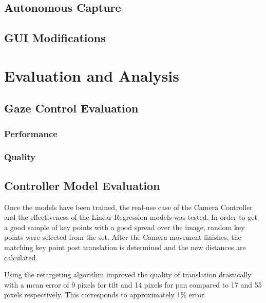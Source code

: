 \documentclass{l4proj}
\begin{document}
\section{Autonomous Capture}

\section{GUI Modifications}


\chapter{Evaluation and Analysis}

\section{Gaze Control Evaluation}
\subsection{Performance}
\subsection{Quality}

\section{Controller Model Evaluation}

Once the models have been trained, the real-use case of the Camera Controller and the effectiveness of the Linear Regression models was tested. In order to get a good sample of key points with a good spread over the image, random key points were selected from the set. After the Camera movement finishes, the matching key point post translation is determined and the new distances are calculated. 

Using the retargeting algorithm improved the quality of translation drastically with a mean error of 9 pixels for tilt and 14 pixels for pan compared to 17 and 55 pixels respectively. This corresponds to approximately 1\% error.
\end{document}
